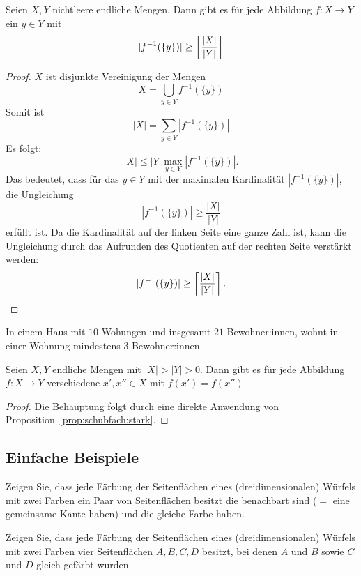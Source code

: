 \begin{prop} \label{prop:schubfach:stark}
	Seien $X, Y$ nichtleere endliche Mengen. Dann gibt es für jede Abbildung $f: X \to Y$ ein $y \in Y$ mit 
	\[
		|f^{-1} (\{y\})|  \ge  \left\lceil \frac{|X|}{|Y|} \right\rceil 
	\]
\end{prop} 
\begin{proof} $X$ ist disjunkte Vereinigung der Mengen 
	\[
			X = \bigcup_{y \in Y} f^{-1}(\{y\}) 
	\]
	Somit ist 
	\[
		|X| = \sum_{y \in Y} | f^{-1}(\{y\}) | 
	\]
	Es folgt: 
	\[
		|X| \le |Y| \max_{y \in Y} |f^{-1}(\{y\}) |. 
	\]
	Das bedeutet, dass für das $y \in Y$ mit der maximalen Kardinalität $|f^{-1}(\{y\}) |$, die Ungleichung 
	\[
			|f^{-1}(\{y\})| \ge \frac{|X|}{|Y|}
	\]
	erfüllt ist. Da die Kardinalität auf der linken Seite eine ganze Zahl ist, kann die Ungleichung durch das Aufrunden des Quotienten auf der rechten Seite verstärkt werden: 
	\[
			|f^{-1}(\{y\})| \ge \left\lceil \frac{|X|}{|Y|} \right\rceil.
	\]
\end{proof} 


\begin{bsp}
	In einem Haus mit $10$ Wohungen und insgesamt $21$ Bewohner:innen, wohnt in einer Wohnung mindestens $3$ Bewohner:innen. 
\end{bsp} 

\begin{kor} 
	Seien $X, Y$ endliche Mengen mit $|X| > |Y| >0$. Dann gibt es für jede Abbildung $f : X \to Y$ verschiedene $x',x''\in X$ mit $f(x')=f(x'')$. 
\end{kor} 
\begin{proof}
	Die Behauptung folgt durch eine direkte Anwendung von Proposition~\ref{prop:schubfach:stark}.
\end{proof} 

\subsection{Einfache Beispiele} 

\begin{aufg}
	Zeigen Sie, dass jede Färbung der Seitenflächen eines (dreidimensionalen) Würfels mit zwei Farben ein Paar von Seitenflächen besitzt	die benachbart sind ($=$ eine gemeinsame Kante haben) und die gleiche Farbe haben. 
\end{aufg}

\begin{aufg}
	Zeigen Sie, dass jede Färbung der Seitenflächen eines (dreidimensionalen) Würfels mit zwei Farben vier Seitenflächen $A,B,C,D$ besitzt, bei denen $A$ und $B$ sowie $C$ und $D$ gleich gefärbt wurden. 
\end{aufg} 

